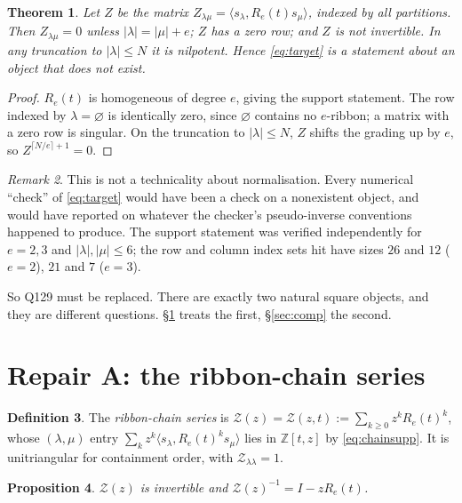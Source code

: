 \documentclass[11pt]{article}
\newtheorem{theorem}{Theorem}[section]
\newtheorem{proposition}[theorem]{Proposition}
\theoremstyle{definition}
\newtheorem{definition}[theorem]{Definition}
\theoremstyle{remark}
\newtheorem{remark}[theorem]{Remark}
\newcommand{\Z}{\mathbb{Z}}
\newcommand{\Zc}{\mathcal{Z}}
\begin{document}
\begin{theorem}\label{thm:gate}
Let $Z$ be the matrix $Z_{\lambda\mu}=\langle s_\lambda,R_e(t)s_\mu\rangle$, indexed by all
partitions.  Then $Z_{\lambda\mu}=0$ unless $|\lambda|=|\mu|+e$; $Z$ has a zero row; and $Z$
is not invertible.  In any truncation to $|\lambda|\le N$ it is nilpotent.  Hence
\eqref{eq:target} is a statement about an object that does not exist.
\end{theorem}

\begin{proof}
$R_e(t)$ is homogeneous of degree $e$, giving the support statement.  The row indexed by
$\lambda=\varnothing$ is identically zero, since $\varnothing$ contains no $e$-ribbon; a
matrix with a zero row is singular.  On the truncation to $|\lambda|\le N$, $Z$ shifts the
grading up by $e$, so $Z^{\lceil N/e\rceil+1}=0$.
\end{proof}

\begin{remark}
This is not a technicality about normalisation.  Every numerical ``check'' of
\eqref{eq:target} would have been a check on a nonexistent object, and would have reported on
whatever the checker's pseudo-inverse conventions happened to produce.  The support statement
was verified independently for $e=2,3$ and $|\lambda|,|\mu|\le6$; the row and column index
sets hit have sizes $26$ and $12$ ($e=2$), $21$ and $7$ ($e=3$).
\end{remark}

So Q129 must be replaced.  There are exactly two natural square objects, and they are
different questions.  \S\ref{sec:chain} treats the first, \S\ref{sec:comp} the second.

\section{Repair A: the ribbon-chain series}\label{sec:chain}

\begin{definition}
The \emph{ribbon-chain series} is
$\Zc(z)=\Zc(z,t):=\sum_{k\ge0}z^kR_e(t)^k$, whose $(\lambda,\mu)$ entry
$\sum_k z^k\langle s_\lambda,R_e(t)^ks_\mu\rangle$ lies in $\Z[t,z]$ by \eqref{eq:chainsupp}.
It is unitriangular for containment order, with $\Zc_{\lambda\lambda}=1$.
\end{definition}

\begin{proposition}\label{prop:resolvent}
$\Zc(z)$ is invertible and $\Zc(z)^{-1}=I-zR_e(t)$.
\end{proposition}
\end{document}
